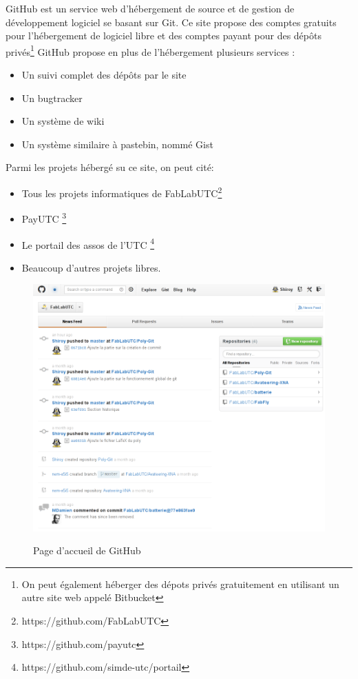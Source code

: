 \documentclass[a4paper]{article}
\begin{document}
GitHub est un service web d'hébergement de source et de gestion de développement logiciel se basant sur Git. Ce site propose des comptes gratuits pour l'hébergement de logiciel libre et des comptes payant pour des dépôts privés\footnote{On peut également héberger des dépots privés gratuitement en utilisant un autre site web appelé Bitbucket}
GitHub propose en plus de l'hébergement plusieurs services : 
\begin{itemize}
\item Un suivi complet des dépôts par le site
\item Un bugtracker
\item Un système de wiki
\item Un système similaire à pastebin, nommé Gist
\end{itemize}

Parmi les projets hébergé su ce site, on peut cité:
\begin{itemize}
\item Tous les projets informatiques de FabLabUTC\footnote{https://github.com/FabLabUTC}
\item PayUTC \footnote{https://github.com/payutc}
\item Le portail des assos de l'UTC \footnote{https://github.com/simde-utc/portail}
\item Beaucoup d'autres projets libres.
\end{itemize}

\begin{figure}
\includegraphics[scale=0.6]{accueil_github.png}
\label{Page d'accueil de GitHub}
\caption{Page d'accueil de GitHub}
\end{figure}
\end{document}
